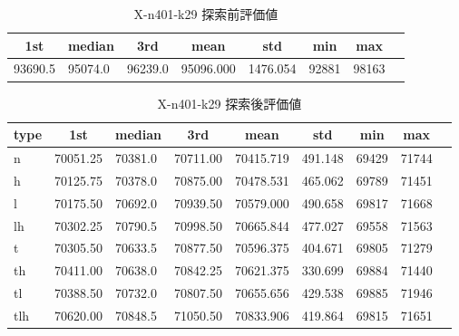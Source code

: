 \begin{table}[htbp]
    \centering
    \caption{X-n401-k29 探索前評価値}
    \begin{tabular}{|l|l|l|l|l|l|l|l|}\hline
    \multicolumn{1}{|c|}{\textbf{1st}}
    &\multicolumn{1}{c|}{\textbf{median}}
    &\multicolumn{1}{c|}{\textbf{3rd}}
    &\multicolumn{1}{c|}{\textbf{mean}}
    &\multicolumn{1}{c|}{\textbf{std}}
    &\multicolumn{1}{c|}{\textbf{min}}
    &\multicolumn{1}{c|}{\textbf{max}}\\\hline
	93690.5 & 95074.0 & 96239.0 & 95096.000 & 1476.054 & 92881 & 98163\\\hline
	\end{tabular}
\end{table}
\begin{table}[htbp]
    \centering
    \caption{X-n401-k29 探索後評価値}
    \begin{tabular}{|l|l|l|l|l|l|l|l|l|}\hline
    \multicolumn{1}{|c|}{\textbf{type}}
    &\multicolumn{1}{|c|}{\textbf{1st}}
    &\multicolumn{1}{c|}{\textbf{median}}
    &\multicolumn{1}{c|}{\textbf{3rd}}
    &\multicolumn{1}{c|}{\textbf{mean}}
    &\multicolumn{1}{c|}{\textbf{std}}
    &\multicolumn{1}{c|}{\textbf{min}}
    &\multicolumn{1}{c|}{\textbf{max}}\\\hline
	n & 70051.25 & 70381.0 & 70711.00 & 70415.719 & 491.148 & 69429 & 71744\\\hline
	h & 70125.75 & 70378.0 & 70875.00 & 70478.531 & 465.062 & 69789 & 71451\\\hline
	l & 70175.50 & 70692.0 & 70939.50 & 70579.000 & 490.658 & 69817 & 71668\\\hline
	lh & 70302.25 & 70790.5 & 70998.50 & 70665.844 & 477.027 & 69558 & 71563\\\hline
	t & 70305.50 & 70633.5 & 70877.50 & 70596.375 & 404.671 & 69805 & 71279\\\hline
	th & 70411.00 & 70638.0 & 70842.25 & 70621.375 & 330.699 & 69884 & 71440\\\hline
	tl & 70388.50 & 70732.0 & 70807.50 & 70655.656 & 429.538 & 69885 & 71946\\\hline
	tlh & 70620.00 & 70848.5 & 71050.50 & 70833.906 & 419.864 & 69815 & 71651\\\hline
	\end{tabular}
\end{table}
